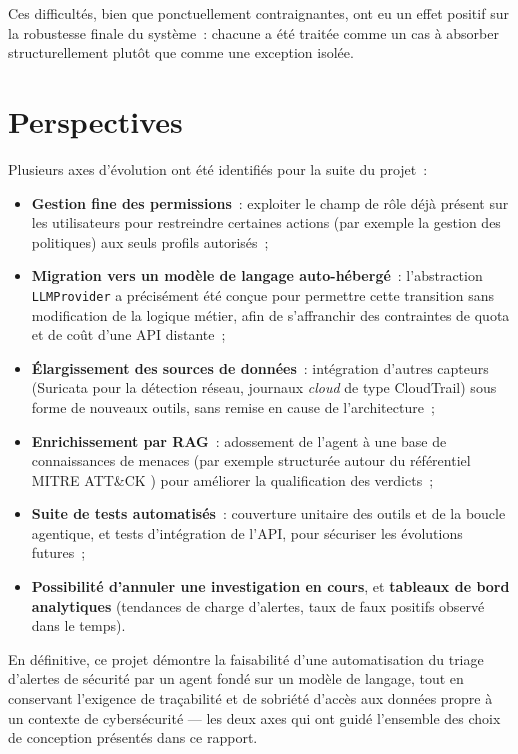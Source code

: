 Ces difficultés, bien que ponctuellement contraignantes, ont eu un effet
positif sur la robustesse finale du système~: chacune a été traitée comme
un cas à absorber structurellement plutôt que comme une exception isolée.

\section{Perspectives}

Plusieurs axes d'évolution ont été identifiés pour la suite du projet~:

\begin{itemize}
  \item \textbf{Gestion fine des permissions}~: exploiter le champ de rôle
        déjà présent sur les utilisateurs pour restreindre certaines
        actions (par exemple la gestion des politiques) aux seuls profils
        autorisés~;
  \item \textbf{Migration vers un modèle de langage auto-hébergé}~:
        l'abstraction \texttt{LLMProvider} a précisément été conçue pour
        permettre cette transition sans modification de la logique
        métier, afin de s'affranchir des contraintes de quota et de coût
        d'une API distante~;
  \item \textbf{Élargissement des sources de données}~: intégration
        d'autres capteurs (Suricata pour la détection réseau, journaux
        \textit{cloud} de type CloudTrail) sous forme de nouveaux outils,
        sans remise en cause de l'architecture~;
  \item \textbf{Enrichissement par RAG}~: adossement de l'agent à une base
        de connaissances de menaces (par exemple structurée autour du
        référentiel MITRE ATT\&CK \cite{mitre_attack}) pour améliorer la
        qualification des verdicts~;
  \item \textbf{Suite de tests automatisés}~: couverture unitaire des
        outils et de la boucle agentique, et tests d'intégration de l'API,
        pour sécuriser les évolutions futures~;
  \item \textbf{Possibilité d'annuler une investigation en cours}, et
        \textbf{tableaux de bord analytiques} (tendances de charge
        d'alertes, taux de faux positifs observé dans le temps).
\end{itemize}

En définitive, ce projet démontre la faisabilité d'une automatisation du
triage d'alertes de sécurité par un agent fondé sur un modèle de langage,
tout en conservant l'exigence de traçabilité et de sobriété d'accès aux
données propre à un contexte de cybersécurité — les deux axes qui ont guidé
l'ensemble des choix de conception présentés dans ce rapport.
